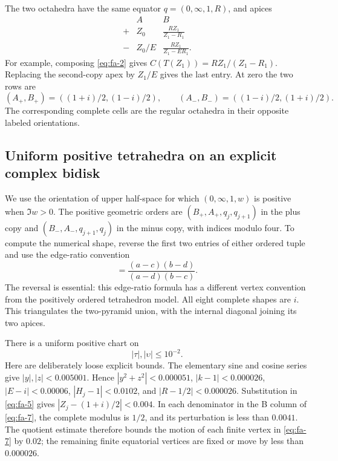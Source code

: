 The two octahedra have the same equator \(q=(0,\infty,1,R)\), and apices
\begin{equation}
\begin{array}{c|cc}
 & A & B\\ \hline
 +&Z_0&\displaystyle\frac{RZ_1}{Z_1-R_1}\\[2mm]
 -&Z_0/E&\displaystyle\frac{RZ_1}{Z_1-ER_1}.
\end{array}
\label{eq:fa-7}
\end{equation}
For example, composing \eqref{eq:fa-2} gives \(C(T(Z_1))=RZ_1/(Z_1-R_1)\). Replacing the second-copy apex by \(Z_1/E\) gives the last entry. At zero the two rows are
\begin{equation}
(A_+,B_+)=((1+i)/2,(1-i)/2),\qquad
 (A_-,B_-)=((1-i)/2,(1+i)/2).
\label{eq:fa-8}
\end{equation}
The corresponding complete cells are the regular octahedra in their opposite labeled orientations.

\subsection{Uniform positive tetrahedra on an explicit complex bidisk}\label{sec:fa-3}

We use the orientation of upper half-space for which
\((0,\infty,1,w)\) is positive when \(\Im w>0\). The positive
geometric orders are \((B_+,A_+,q_j,q_{j+1})\) in the plus copy
and \((B_-,A_-,q_{j+1},q_j)\) in the minus copy, with indices
modulo four. To compute the numerical shape, reverse the first two
entries of either ordered tuple and use the edge-ratio convention
\begin{equation}
[a,b,c,d]=\frac{(a-c)(b-d)}{(a-d)(b-c)}.
\label{eq:fa-9}
\end{equation}
The reversal is essential: this edge-ratio formula has a different
vertex convention from the positively ordered tetrahedron model.
All eight complete shapes are \(i\). This triangulates the two-pyramid union, with the internal diagonal joining its two apices.

There is a uniform positive chart on
\begin{equation}
|\tau|,|\upsilon|\le 10^{-2}.
\label{eq:fa-10}
\end{equation}
Here are deliberately loose explicit bounds. The elementary sine and cosine series give \(|y|,|z|<0.005001\). Hence \(|y^2+z^2|<0.000051\), \(|k-1|<0.000026\), \(|E-i|<0.00006\), \(|H_j-1|<0.0102\), and \(|R-1/2|<0.000026\). Substitution in \eqref{eq:fa-5} gives \(|Z_j-(1+i)/2|<0.004\). In each denominator in the B column of \eqref{eq:fa-7}, the complete modulus is \(1/2\), and its perturbation is less than \(0.0041\). The quotient estimate therefore bounds the motion of each finite vertex in \eqref{eq:fa-7} by \(0.02\); the remaining finite equatorial vertices are fixed or move by less than \(0.000026\).

